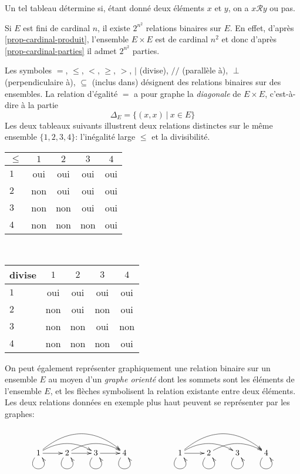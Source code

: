 Un tel tableau détermine si, étant donné deux éléments $x$ et $y$, on a $x\mathcal R y$ ou pas. 



\begin{exemple}
Si $E$ est fini de cardinal $n$, il existe $2^{n^2}$ relations binaires sur $E$. En effet, d'après \ref{prop-cardinal-produit}, l'ensemble $E\times E$ est de cardinal $n^2$ et donc d'après \ref{prop-cardinal-parties} il admet $2^{n^2}$ parties.
\end{exemple} 

\begin{exemples}
Les symboles $=$, $\leq$, $<$, $\geq$, $>$, $|$ (divise), $//$ (parallèle à), $\perp$ (perpendiculaire à), $\subseteq$ (inclus dans) désignent des relations binaires sur des ensembles. La relation d'égalité $=$ a pour graphe la \emph{diagonale} de $E\times E$, c'est-à-dire à la partie 
\[ \Delta_E = \{(x,x)\:|\: x\in E\}\]
Les deux tableaux suivants illustrent deux relations distinctes sur le même ensemble $\{1,2,3,4\}$: l'inégalité large $\leq$ et la divisibilité.
\begin{center}
\begin{tabular}{|l|c|c|c|c|}\hline
$\leq$ & $1$ & $2$ & $3$ & $4$ \\ \hline
$1$ 	& oui & oui & oui & oui \\ \hline
$2$ 	& non & oui & oui & oui \\ \hline
$3$ & non & non & oui & oui \\ \hline
$4$	& non & non & non & oui \\ \hline
\end{tabular}
~~~
\begin{tabular}{|l|c|c|c|c|}\hline
divise & $1$ & $2$ & $3$ & $4$ \\ \hline
$1$ 	& oui & oui & oui & oui \\ \hline
$2$ 	& non & oui & non & oui \\ \hline
$3$ & non & non & oui & non \\ \hline
$4$	& non & non & non & oui \\ \hline
\end{tabular}
\end{center}
\end{exemples}

On peut également représenter graphiquement une relation binaire sur un ensemble $E$ au moyen d'un \emph{graphe orienté} dont les sommets sont les éléments de l'ensemble $E$, et les flèches symbolisent la relation existante entre deux éléments. Les deux relations données en exemple plus haut peuvent se représenter par les graphes:
\[
\xymatrix{
& & & \\
1 \ar@(dl,dr) \ar[r] \ar@/^1pc/[rr] \ar@/^2pc/[rrr] 
& 2 \ar@(dl,dr) \ar[r] \ar@/^1pc/[rr] 
& 3 \ar@(dl,dr) \ar[r]
& 4 \ar@(dl,dr)\\
& & & 
}
\hspace{2cm}
\xymatrix{
& & & \\
1 \ar@(dl,dr) \ar[r] \ar@/^1pc/[rr] \ar@/^2pc/[rrr] 
& 2 \ar@(dl,dr)  \ar@/^1pc/[rr] 
& 3 \ar@(dl,dr) 
& 4 \ar@(dl,dr)\\
& & & 
}
\]

